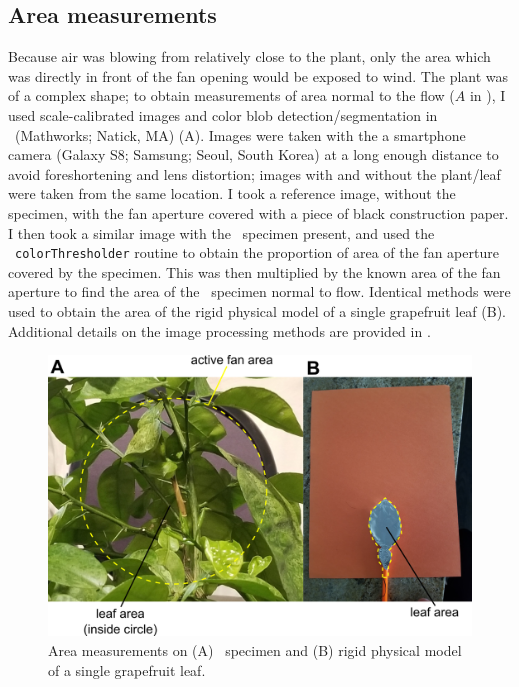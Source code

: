 \subsection{Area measurements}
Because air was blowing from relatively close to the plant, only the area which was directly in front of the fan opening would be exposed to wind. The plant was of a complex shape; to obtain measurements of area normal to the flow ($A$ in ), I used scale-calibrated images and color blob detection/segmentation in \Matlab\ (Mathworks; Natick, MA) (A). Images were taken with the a smartphone camera (Galaxy S8; Samsung; Seoul, South Korea) at a long enough distance to avoid foreshortening and lens distortion; images with and without the plant/leaf were taken from the same location. I took a reference image, without the specimen, with the fan aperture covered with a piece of black construction paper. I then took a similar image with the \Cxparadisi\ specimen present, and used the \Matlab\ \lstinline{colorThresholder} routine to obtain the proportion of area of the fan aperture covered by the specimen. This was then multiplied by the known area of the fan aperture to find the area of the \Cxparadisi\ specimen normal to flow. Identical methods were used to obtain the area of the rigid physical model of a single grapefruit leaf (B). Additional details on the image processing methods are provided in . 
\begin{figure}
\begin{center}
\includegraphics{figures/fig2.png}
\end{center}
\caption{Area measurements on (A) \Cxparadisi\ specimen and (B) rigid physical model of a single grapefruit leaf.}
\label{fig:methods:area}
\end{figure}





